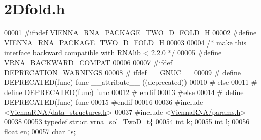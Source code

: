 \hypertarget{2Dfold_8h_source}{}\section{2\+Dfold.h}
\label{2Dfold_8h_source}

\begin{DoxyCode}
00001 \textcolor{preprocessor}{#ifndef VIENNA\_RNA\_PACKAGE\_TWO\_D\_FOLD\_H}
00002 \textcolor{preprocessor}{#define VIENNA\_RNA\_PACKAGE\_TWO\_D\_FOLD\_H}
00003 
00004 \textcolor{comment}{/* make this interface backward compatible with RNAlib < 2.2.0 */}
00005 \textcolor{preprocessor}{#define VRNA\_BACKWARD\_COMPAT}
00006 
00007 \textcolor{preprocessor}{#ifdef DEPRECATION\_WARNINGS}
00008 \textcolor{preprocessor}{# ifdef \_\_GNUC\_\_}
00009 \textcolor{preprocessor}{#  define DEPRECATED(func) func \_\_attribute\_\_ ((deprecated))}
00010 \textcolor{preprocessor}{# else}
00011 \textcolor{preprocessor}{#  define DEPRECATED(func) func}
00012 \textcolor{preprocessor}{# endif}
00013 \textcolor{preprocessor}{#else}
00014 \textcolor{preprocessor}{# define DEPRECATED(func) func}
00015 \textcolor{preprocessor}{#endif}
00016 
00036 \textcolor{preprocessor}{#include <\hyperlink{data__structures_8h}{ViennaRNA/data\_structures.h}>}
00037 \textcolor{preprocessor}{#include <\hyperlink{params_8h}{ViennaRNA/params.h}>}
00038 
\hypertarget{2Dfold_8h_source.tex_l00053}{}\hyperlink{group__kl__neighborhood__mfe}{00053} \textcolor{keyword}{typedef} \textcolor{keyword}{struct }\hyperlink{group__kl__neighborhood__mfe_structvrna__sol__TwoD__t}{vrna\_sol\_TwoD\_t}\{
\hypertarget{2Dfold_8h_source.tex_l00054}{}\hyperlink{group__kl__neighborhood__mfe_ac111e850bb3b3a11b6b5707912cfa1b8}{00054}   \textcolor{keywordtype}{int} \hyperlink{group__kl__neighborhood__mfe_ac111e850bb3b3a11b6b5707912cfa1b8}{k};          
\hypertarget{2Dfold_8h_source.tex_l00055}{}\hyperlink{group__kl__neighborhood__mfe_ab8e95cd920901175a2cc8de726ab1d36}{00055}   \textcolor{keywordtype}{int} \hyperlink{group__kl__neighborhood__mfe_ab8e95cd920901175a2cc8de726ab1d36}{l};          
\hypertarget{2Dfold_8h_source.tex_l00056}{}\hyperlink{group__kl__neighborhood__mfe_a7577863a6a84224dfee39b321c03cab1}{00056}   \textcolor{keywordtype}{float} \hyperlink{group__kl__neighborhood__mfe_a7577863a6a84224dfee39b321c03cab1}{en};       
\hypertarget{2Dfold_8h_source.tex_l00057}{}\hyperlink{group__kl__neighborhood__mfe_ac5942d2505a6cd7e4a8073a321d5d2d5}{00057}   \textcolor{keywordtype}{char} *\hyperlink{group__kl__neighborhood__mfe_ac5942d2505a6cd7e4a8073a321d5d2d5}{s};        

\end{DoxyCode}
